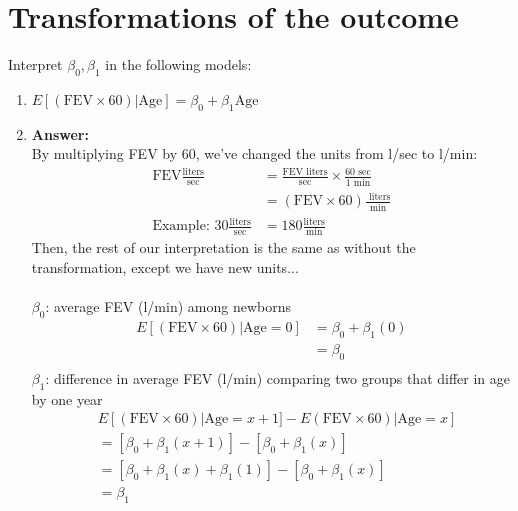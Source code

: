 \documentclass{article}
\begin{document}
\section{Transformations of the outcome}
Interpret $\beta_0, \beta_1$ in the following models:
\begin{enumerate}\itemsep +5pt
\item $E[(\text{FEV}\times 60)|\text{Age}] = \beta_0 + \beta_1 \text{Age}$ 
\item[] \color{blue} \textbf{Answer:} \\
By multiplying FEV by 60, we've changed the units from l/sec to l/min:
\begin{align*}
\text{FEV}\frac{\text{liters}}{\text{sec}} & =\frac{\text{FEV liters}}{\text{sec}} \times \frac{60 \text{ sec}}{1\text{ min}} \\
& = (\text{FEV} \times 60) \frac{\text{ liters}}{\text{min}}\\
\text{Example: } 30\frac{\text{liters}}{\text{sec}} &= 180\frac{\text{liters}}{\text{min}}
\end{align*}
Then, the rest of our interpretation is the same as without the transformation, except we have new units...\\ \\
$\beta_0$: average FEV (l/min) among newborns \\
\begin{align*}
E[(\text{FEV}\times 60)|\text{Age} = 0] & = \beta_0+ \beta_1(0) \\
& = \beta_0 \\
\end{align*}
$\beta_1$: difference in average FEV (l/min) comparing two groups that differ in age by one year
\begin{align*}
&E[(\text{FEV}\times 60)|\text{Age} = x + 1] - E(\text{FEV}\times 60)|\text{Age} = x ] \\
&=\left[\beta_0 + \beta_1\left( x + 1\right)\right] - \left[\beta_0 + \beta_1\left( x \right)\right] \\
&=\left[\beta_0 + \beta_1(x) + \beta_1 (1)\right] -\left[\beta_0 + \beta_1(x)\right]\\
& = \beta_1
\end{align*}
\color{black}


\end{enumerate}
\end{document}
